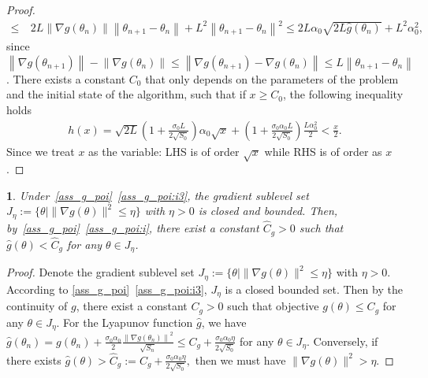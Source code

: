 \documentclass[standalone]{article}
\newtheorem{property}[lem]{\text{Property}}
\begin{document}
\begin{proof}
\begin{align}
\leq &\ 2 L\left\|\nabla g(\theta_{n}) \right\| \left\|\theta_{n+1} - \theta_n \right\|  +  L^2\left\|\theta_{n+1} - \theta_n \right\|^2 \leq 2 L\alpha_0\sqrt{2 L \hat{g}(\theta_n)} +  L^2\alpha_0^2,
\end{align} 
since $\left\|\nabla g(\theta_{n+1}) \right\| - \left\| \nabla g(\theta_n) \right\| \leq \left\|\nabla g(\theta_{n+1})  - \nabla g(\theta_n) \right\| \leq  L \left\| \theta_{n+1} - \theta_n\right\| $.
There exists a constant \(C_{0}\) that only depends on the parameters of the problem and the initial state of the algorithm, such that if $x \geq C_0$, the following inequality holds
\begin{align*}
h(x)=\sqrt{2 L}\left(1 + \frac{\sigma_0 L}{2\sqrt{S_0}}\right)\alpha_0\sqrt{x} + \left(1  + \frac{\sigma_0\alpha_0 L}{2\sqrt{S_0}}\right)\frac{ L\alpha_0^2}{2}<\frac{x}{2}.
\end{align*} Since we treat $x$ as the variable: LHS is of order  \(\sqrt{x}\) while RHS is of order as \(x\). 
\end{proof}

\begin{property}\label{pro_0}
Under~\cref{ass_g_poi}~\ref{ass_g_poi:i3}, the gradient sublevel set $J_{\eta}:=\{\theta \mid \|\nabla g(\theta)\|^{2}\le \eta\}$ with $\eta >0$ is closed and bounded. Then, by~\cref{ass_g_poi}~\ref{ass_g_poi:i}, there exist a constant $\hat{C}_{g} > 0$  such that $\hat{g}(\theta) < \hat{C}_{g}$ for any $\theta \in J_{\eta}$. 
\end{property}
\begin{proof}%
Denote the gradient sublevel set $J_{\eta}:=\{\theta \mid \|\nabla g(\theta)\|^{2}\leq \eta\}$ with $\eta >0$. According to \cref{ass_g_poi}~\ref{ass_g_poi:i3}, $J_{\eta}$ is a closed bounded set. Then by the continuity of $g$, there exist a constant $C_{g} > 0$  such that objective  $g(\theta) \leq C_{g}$ for any $\theta \in J_{\eta}$. For the Lyapunov function $\hat{g}$, we have $\hat{g}(\theta_n
) = g(\theta_n) + \frac{\sigma_0\alpha_0}{2}\frac{\left\|\nabla g(\theta_n) \right\|^2}{\sqrt{S_n}} \leq C_{g}+\frac{\sigma_{0}\alpha_{0}\eta}{2\sqrt{S_{0}}}$ for any $\theta \in J_{\eta}$. Conversely, if there exists $\hat{g}(\theta) >  \hat{C}_{g}:=C_{g}+\frac{\sigma_{0}\alpha_{0}\eta}{2\sqrt{S_{0}}},$ then we must have  $\|\nabla g(\theta)\|^{2} > \eta.$ 
\end{proof}
\end{document}
